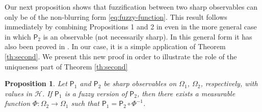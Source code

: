 \documentclass[12pt]{amsart}
\newtheorem{proposition}{Proposition}
\theoremstyle{definition}
\newcommand{\hi}{\mathcal{H}} %
\newcommand{\PP}{\mathsf{P}} %
\newcommand{\frecc}{\rightarrow}
\begin{document}
Our next proposition shows that fuzzification between two sharp observables can only be of the non-blurring form \eqref{eq:fuzzy-function}. This result follows immediately by combining Propositions 1 and 2 in \cite{Ho85} even in the more general case in which $\PP_2$ is an observable (not necessarily sharp). In this general form it has also been proved in \cite{JePu07}. In our case, it is a simple application of Theorem \ref{th:second}. We present this new proof in order to illustrate the role of the uniqueness part of Theorem \ref{th:second}

\begin{proposition}
Let $\PP_1$ and $\PP_2$ be sharp observables on $\Omega_1$, $\Omega_2$, respectively, with values in $\hi$. If $\PP_1$ is a fuzzy version of $\PP_2$, then there exists a measurable function $\Phi : \Omega_2 \frecc \Omega_1$ such that $\PP_1 = \PP_2 \circ \Phi^{-1}$.
\end{proposition}
\end{document}
